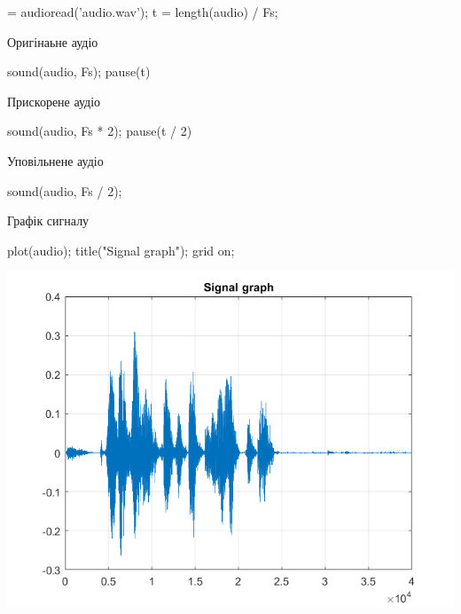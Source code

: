 \documentclass[12pt]{article}
\begin{document}
\begin{matlabcode}
[audio, Fs] = audioread('audio.wav');
t = length(audio) / Fs; %
\end{matlabcode}

\begin{par}
\begin{flushleft}
Оригінаьне аудіо
\end{flushleft}
\end{par}

\begin{matlabcode}
sound(audio, Fs);
pause(t)
\end{matlabcode}

\begin{par}
\begin{flushleft}
Прискорене аудіо
\end{flushleft}
\end{par}

\begin{matlabcode}
sound(audio, Fs * 2);
pause(t / 2)
\end{matlabcode}

\begin{par}
\begin{flushleft}
Уповільнене аудіо
\end{flushleft}
\end{par}

\begin{matlabcode}
sound(audio, Fs / 2);
\end{matlabcode}

\vspace{1em}

\begin{par}
\begin{flushleft}
Графік сигналу
\end{flushleft}
\end{par}

\begin{matlabcode}
plot(audio);
title("Signal graph");
grid on;
\end{matlabcode}
\begin{center}
\includegraphics[width=\maxwidth{56.196688409433015em}]{figure_0}
\end{center}
\end{document}
